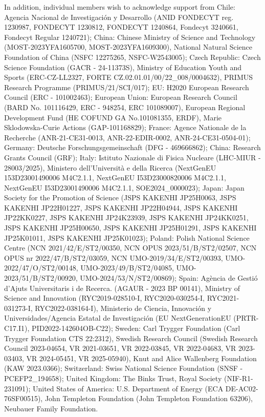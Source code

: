 \documentclass[PAPER, atlasdraft=false, cernpreprint,UKenglish, texmf, orcidlogo]{atlasdoc}
\begin{document}
In addition, individual members wish to acknowledge support from Chile: Agencia Nacional de Investigaci\'on y Desarrollo (ANID FONDECYT reg. 1230987, FONDECYT 1230812, FONDECYT 1240864, Fondecyt 3240661, Fondecyt Regular 1240721); China: Chinese Ministry of Science and Technology (MOST-2023YFA1605700, MOST-2023YFA1609300), National Natural Science Foundation of China (NSFC 12275265, NSFC-W2543005); Czech Republic: Czech Science Foundation (GACR - 24-11373S), Ministry of Education Youth and Sports (ERC-CZ-LL2327, FORTE CZ.02.01.01/00/22\_008/0004632), PRIMUS Research Programme (PRIMUS/21/SCI/017); EU: H2020 European Research Council (ERC - 101002463); European Union: European Research Council (BARD No. 101116429, ERC - 948254, ERC 101089007), European Regional Development Fund (HE COFUND GA No.101081355, ERDF), Marie Sklodowska-Curie Actions (GAP-101168829); France: Agence Nationale de la Recherche (ANR-21-CE31-0013, ANR-22-EDIR-0002, ANR-24-CE31-0504-01); Germany: Deutsche Forschungsgemeinschaft (DFG - 469666862); China: Research Grants Council (GRF); Italy: Istituto Nazionale di Fisica Nucleare (LHC-MIUR - 28003/2025), Ministero dell'Università e della Ricerca (NextGenEU 153D23001490006 M4C2.1.1, NextGenEU I53D23000820006 M4C2.1.1, NextGenEU I53D23001490006 M4C2.1.1, SOE2024\_0000023); Japan: Japan Society for the Promotion of Science (JSPS KAKENHI  JP25H0063, JSPS KAKENHI JP22H01227, JSPS KAKENHI JP22H04944, JSPS KAKENHI JP22KK0227, JSPS KAKENHI JP24K23939, JSPS KAKENHI JP24KK0251, JSPS KAKENHI JP25H00650, JSPS KAKENHI JP25H01291, JSPS KAKENHI JP25K01011, JSPS KAKENHI JP25K01023); Poland: Polish National Science Centre (NCN 2021/42/E/ST2/00350, NCN OPUS 2023/51/B/ST2/02507, NCN OPUS nr 2022/47/B/ST2/03059, NCN UMO-2019/34/E/ST2/00393, UMO-2022/47/O/ST2/00148, UMO-2023/49/B/ST2/04085, UMO-2023/51/B/ST2/00920, UMO-2024/53/N/ST2/00869); Spain: Agència de Gestió d'Ajuts Universitaris i de Recerca. (AGAUR - 2023 BP 00141), Ministry of Science and Innovation (RYC2019-028510-I, RYC2020-030254-I, RYC2021-031273-I, RYC2022-038164-I), Ministerio de Ciencia, Innovación y Universidades/Agencia Estatal de Investigaci\'on (EU NextGenerationEU (PRTR-C17.I1), PID2022-142604OB-C22); Sweden: Carl Trygger Foundation (Carl Trygger Foundation CTS 22:2312), Swedish Research Council (Swedish Research Council 2023-04654, VR 2021-03651, VR 2022-03845, VR 2022-04683, VR 2023-03403, VR 2024-05451, VR 2025-05940), Knut and Alice Wallenberg Foundation (KAW 2023.0366); Switzerland: Swiss National Science Foundation (SNSF - PCEFP2\_194658); United Kingdom: The Binks Trust, Royal Society (NIF-R1-231091); United States of America: U.S. Department of Energy (ECA DE-AC02-76SF00515), John Templeton Foundation (John Templeton Foundation 63206), Neubauer Family Foundation.
\end{document}
